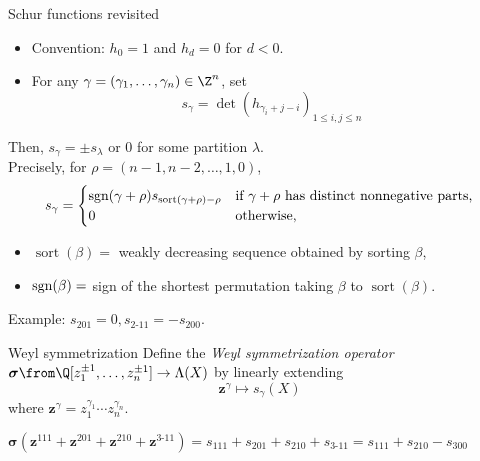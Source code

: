 \documentclass[dvipsnames,handout]{beamer}
\newcommand{\zz}{{\boldsymbol z}}
\newcommand{\sigmabold}{\boldsymbol \sigma}
\newcommand{\sgn}{\text{\rm sgn}}
\DeclareMathOperator{\sort}{sort}
\theoremstyle{definition}
\newcounter{c}
\begin{document}
\begin{frame}{Schur functions revisited}
  \begin{itemize}
  \item Convention: \(h_0 = 1\) and \(h_d = 0\) for \(d < 0\).
  \item For any \(\gamma = (\gamma_1,\ldots,\gamma_n) \in \Z^n \), set
    \[
      s_\gamma =  \det(h_{\gamma_i+j-i})_{1 \leq i,j
        \leq n}
    \] \pause
  \end{itemize}
  Then, \(s_\gamma = \pm s_\lambda\) or 0 for some partition
  \(\lambda\). \pause\\
  
  Precisely, for \(\rho = (n-1,n-2, \ldots, 1,0)\),
  \[
    s_\gamma = 
\begin{cases}
\sgn(\gamma+\rho) s_{\sort(\gamma+\rho) -\rho} & \text{if $\gamma +
                                                 \rho$ has distinct
                                                 nonnegative parts,}\\
0                                                          & \text{otherwise,}
\end{cases}
  \]
\begin{itemize}
\item $\sort(\beta) = $ weakly decreasing sequence obtained by sorting $\beta$,
\vspace{-1mm}
\item $\sgn(\beta) =$ sign of the shortest permutation taking $\beta$ to $\sort(\beta)$.
\end{itemize}
Example: \(s_{201} = 0, s_{2\text{-}11} = -s_{200}\).
\end{frame}
\begin{frame}{Weyl symmetrization}
 Define the \emph{Weyl symmetrization operator} \(\sigmabold \from
 \Q[z_1^{\pm 1},\ldots, z_n^{\pm 1}] \to \Lambda(X)\) by linearly
 extending
 \[
   \zz^\gamma \mapsto s_\gamma(X)
 \]
 where \(\zz^\gamma = z_1^{\gamma_1} \cdots z_n^{\gamma_n}\). \pause

 \begin{example}
   \(\sigmabold(\zz^{111}+\zz^{201}+\zz^{210}+\zz^{3\text{-}11}) =
   s_{111}+s_{201}+s_{210}+s_{3\text{-}11} = s_{111}+s_{210}-s_{300}\)
 \end{example}
\end{frame}
\end{document}

